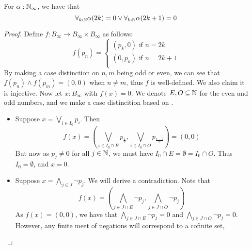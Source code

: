 \begin{theorem}\label{LLPOThm}
  For $\alpha:\mathbb{N}_\infty$, 
  we have that 
  \begin{equation}\label{eqnLLPO}
    \forall_{k:\mathbb{N}} \alpha(2k) = 0  \vee \forall_{k:\mathbb{N}} \alpha(2k+1) = 0
  \end{equation}
\end{theorem}
\begin{proof}
%
  Define $f:B_\infty \to B_\infty \times B_\infty$ as follows:
  \begin{equation}
    f(p_n) =\begin{cases}
      (p_k,0) \text{ if } n = 2k\\
      (0,p_k) \text{ if } n = 2k+1\\
    \end{cases}
  \end{equation}
  By making a case distinction on $n,m$ being odd or even, 
  we can see that 
  $f(p_n) \wedge f(p_m) = (0,0)$ when $n\neq m$, thus $f$ is well-defined. 
  We also claim it is injective.
  Now let $x:B_\infty$ with $f(x) = 0$. 
  We denote $E,O\subseteq \mathbb{N}$ for the even and odd numbers, 
  and we make a case distincition based on .
  \begin{itemize}
    \item Suppose 
      $x = \bigvee_{i\in I_0} p_i$. 
      Then 
      $$f(x) = (\bigvee_{i\in I_0 \cap E } p_{\frac i2} , \bigvee_{i\in I_0 \cap O } p_{\frac {i-1}2} ) = (0,0)$$
      But now as $p_j\neq 0$ for all $j\in\mathbb{N}$, we must have $I_0 \cap E = \emptyset = I_0 \cap O$. 
      Thus $I_0= \emptyset$, and $x = 0$. 
    \item Suppose 
      $x = \bigwedge_{j\in J} \neg p_j$. %
      We will derive a contradiction. %
      Note that   
      $$f(x) = (\bigwedge_{j\in J \cap E } \neg p_j , \bigwedge_{j\in J \cap O } \neg p_j )$$
      As $f(x) = (0,0)$, we have that 
      $\bigwedge_{j\in J \cap E } \neg p_j =0$ and
      $\bigwedge_{j\in J \cap O } \neg p_j  = 0$.
      However, any finite meet of negations will correspond to a cofinite set,

\end{itemize}
\end{proof}
